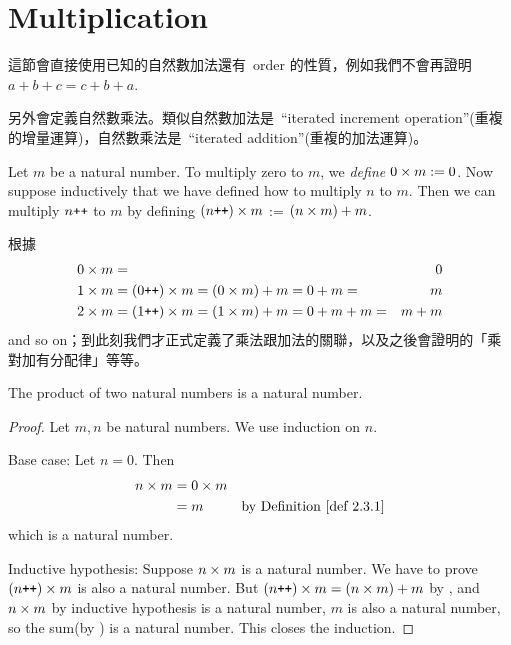\section{Multiplication}\label{sec 2.3}


\begin{note}
這節會直接使用已知的自然數加法還有\ order 的性質，例如我們不會再證明\ \(a + b + c = c + b + a\).

另外會定義自然數乘法。類似自然數加法是\ ``iterated increment operation''(重複的增量運算)，自然數乘法是\ ``iterated addition''(重複的加法運算)。
\end{note}

\begin{definition}\label{def 2.3.1} Let \(m\) be a natural number. To multiply zero to \(m\), we \emph{define} \(0 \times m := 0\). Now suppose inductively that we have defined how to multiply \(n\) to \(m\). Then we can multiply \(n\texttt{++}\) to \(m\) by defining \((n\texttt{++}) \times m\) := \((n \times m) + m\).
\end{definition}

\begin{note}
根據\ 
    \begin{align*}
    0 \times m & = & 0 \\
    1 \times m & = (0\texttt{++}) \times m = (0 \times m) + m = 0 + m = & m \\
    2 \times m & = (1\texttt{++}) \times m = (1 \times m) + m = 0 + m + m = & m + m
    \end{align*}
and so on；到此刻我們才正式定義了乘法跟加法的關聯，以及之後會證明的「乘對加有分配律」等等。
\end{note}

\begin{additional corollary} \label{ac 2.3.1}
The product of two natural numbers is a natural number.
\end{additional corollary}
\begin{proof}
Let \(m, n\) be natural numbers. We use induction on \(n\).

Base case: Let \(n = 0\). Then
\begin{align*}
    n \X m & = 0 \X m & \\
           & = m      & \text{by \DEF{2.3.1}}
\end{align*}
which is a natural number.

Inductive hypothesis: Suppose \(n \times m\) is a natural number. We have to prove \((n\texttt{++}) \times m\) is also a natural number. But \((n\texttt{++}) \times m = (n \times m) + m\) by , and \(n \times m\) by inductive hypothesis is a natural number, \(m\) is also a natural number, so the sum(by ) is a natural number. This closes the induction.
\end{proof}

